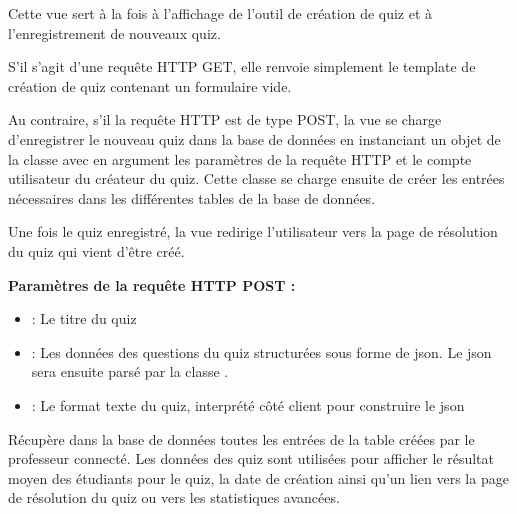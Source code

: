 \documentclass[a4,10pt,french]{sphinxmanual}
\begin{document}
\begin{fulllineitems}
\label{source:quiz.views.create}
Cette vue sert à la fois à l'affichage de l'outil de création de quiz et à
l'enregistrement de nouveaux quiz.

S'il s'agit d'une requête HTTP GET, elle renvoie simplement le template de
création de quiz contenant un formulaire vide.

Au contraire, s'il la requête HTTP est de type POST, la vue se charge d'enregistrer
le nouveau quiz dans la base de données en instanciant un objet de la classe
{\hyperref[source:quiz.utils.save.SaveQuiz]{\emph{}}} avec en argument les paramètres de la requête HTTP et le compte
utilisateur du créateur du quiz. Cette
classe se charge ensuite de créer les entrées nécessaires dans les différentes tables de
la base de données.

Une fois le quiz enregistré, la vue redirige l'utilisateur vers la page de
résolution du quiz qui vient d'être créé.

\textbf{Paramètres de la requête HTTP POST :}
\begin{itemize}
\item {} 
 : Le titre du quiz

\item {} 
 : Les données des questions du quiz structurées sous forme de json. Le json sera ensuite parsé par la classe .

\item {} 
 : Le format texte du quiz, interprété côté client pour construire le json

\end{itemize}

\end{fulllineitems}


\begin{fulllineitems}
\label{source:quiz.views.created_quizzes}
Récupère dans la base de données toutes les entrées de la table  créées
par le professeur connecté. Les données des quiz sont utilisées pour afficher
le résultat moyen des étudiants pour le quiz, la date de création ainsi qu'un lien vers la page de
résolution du quiz ou vers les statistiques avancées.

\end{fulllineitems}
\end{document}
